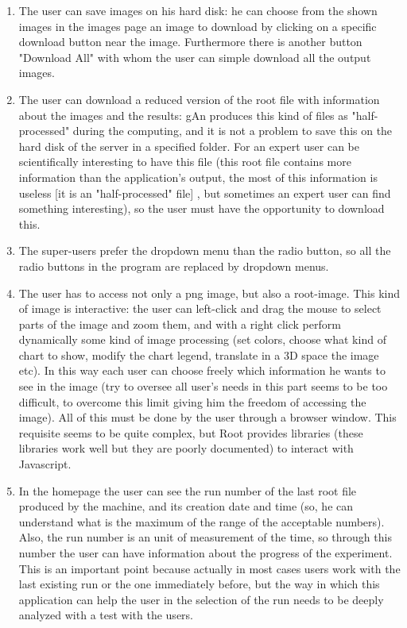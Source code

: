 \begin{enumerate}
\item The user can save images on his hard disk: he can choose from the shown images in the images page an image to download by clicking on a specific download button near the image. Furthermore there is another button "Download All" with whom the user can simple download all the output images.

\item The user can download a reduced version of the root file with information about the images and the results: gAn produces this kind of files as "half-processed" during the computing, and it is not a problem to save this on the hard disk of the server in a specified folder. For an expert user can be scientifically interesting to have this file (this root file contains more information than the application's output, the most of this information is useless [it is an "half-processed" file] , but sometimes an expert user can find something interesting), so the user must have the opportunity to download this.     

\item The super-users prefer the dropdown menu than the radio button, so all the radio buttons in the program are replaced by dropdown menus.

\item The user has to access not only a png image, but also a root-image. This kind of image is interactive: the user can left-click and drag the mouse to select parts of the image and zoom them, and with a right click perform dynamically some kind of image processing (set colors, choose what kind of chart to show, modify the chart legend, translate in a 3D space the image etc). In this way each user can choose freely which information he wants to see in the image (try to oversee all user's needs in this part seems to be too difficult, to overcome this limit giving him the freedom of accessing the image).
All of this must be done by the user through a browser window. This requisite seems to be quite complex, but Root provides libraries (these libraries work well but they are poorly documented) to interact with Javascript.

\item In the homepage the user can see the run number of the last root file produced by the machine, and its creation date and time (so, he can understand what is the maximum of the range of the acceptable numbers). Also, the run number is an unit of measurement of the time, so through this number the user can have information about the progress of the experiment. This is an important point because actually in most cases users work with the last existing run or the one immediately before, but the way in which this application can help the user in the selection of the run needs to be deeply analyzed with a test with the users. 


\end{enumerate}
